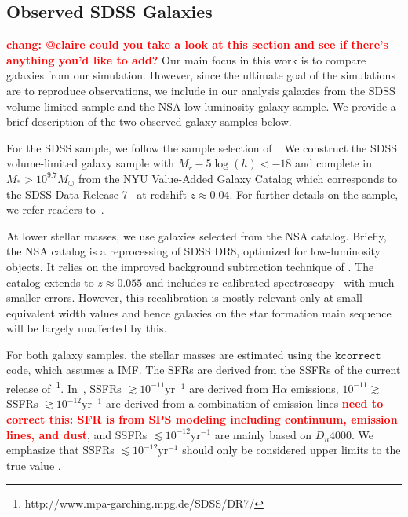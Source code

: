 \documentclass[preprint2,tighten]{aastex62}
\newcommand{\todo}[1]{{\bf \textcolor{red}{ #1}}}
\begin{document}
\subsection{Observed SDSS Galaxies} \label{sec:obvs}
\todo{chang: @claire could you take a look at this section and see if 
there's anything you'd like to add?}
Our main focus in this work is to compare galaxies from our simulation. 
However, since the ultimate goal of the simulations are to reproduce 
observations, we include in our analysis galaxies from the 
SDSS volume-limited sample and the NSA low-luminosity galaxy sample. 
We provide a brief description of the two observed galaxy samples 
below. 

For the SDSS sample, we follow the sample selection of~\cite{tinker2011}. 
We construct the SDSS volume-limited galaxy sample with $M_r - 5\log(h) < -18$ 
and complete in $M_* > 10^{9.7} M_\odot$ from the NYU Value-Added 
Galaxy Catalog \citep[VAGC;][]{blanton2005} which corresponds to 
the SDSS Data Release 7~\citep[DR7;][]{abazajian2009} at redshift 
$z \approx 0.04$. For further details on the sample, we refer readers 
to~\cite{tinker2011,wetzel2013,hahn2017}.

At lower stellar masses, we use galaxies selected from the NSA catalog. Briefly, 
the NSA catalog is a reprocessing of SDSS DR8, optimized for low-luminosity 
objects. It relies on the improved background subtraction technique of 
\cite{blanton2011}. The catalog extends to $z \approx 0.055$ and includes 
re-calibrated spectroscopy~\citep{yan2011,yan2012} with much
smaller errors. However, this recalibration is mostly relevant only at small 
equivalent width values and hence galaxies on the star formation main 
sequence will be largely unaffected by this.

For both galaxy samples, the stellar masses are estimated using the 
\citet{blanton2007} $\mathtt{kcorrect}$ code, which assumes a 
\citep{chabrier2003} IMF. The SFRs are derived from the SSFRs of the 
current release of~\citet{brinchmann2004}\footnote{http://www.mpa-garching.mpg.de/SDSS/DR7/}. 
In~\citet{brinchmann2004}, SSFRs 
$\gtrsim 10^{-11} \mathrm{yr}^{-1}$ are  derived from $\mathrm{H}\alpha$ 
emissions, $10^{-11}\gtrsim$ SSFRs $\gtrsim 10^{-12} \mathrm{yr}^{-1}$ 
are derived from a combination of emission lines \todo{need to correct this: SFR is from SPS modeling including continuum, emission lines, and dust}, and SSFRs 
$\lesssim 10^{-12} \mathrm{yr}^{-1}$ are mainly based on $D_n4000$. 
We emphasize that SSFRs $\lesssim 10^{-12} \mathrm{yr}^{-1}$ should only be 
considered upper limits to the true value \citep{salim2007}.
\end{document}
